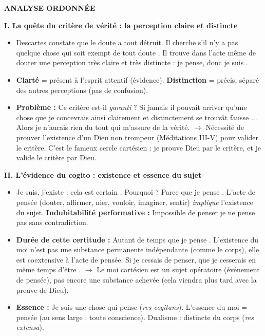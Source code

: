 \documentclass[11pt]{article}
\newcommand{\cle}[1]{{\popxbold\color{popdark}#1}}
\begin{document}
\begin{corrige}
\textbf{ANALYSE ORDONNÉE}

\textbf{I. La quête du critère de vérité : la perception claire et distincte}
\begin{itemize}
\item Descartes constate que le doute a tout détruit. Il cherche \guillemotleft s'il n'y a pas quelque chose qui soit exempt de tout doute \guillemotright. Il trouve dans l'acte même de douter une \cle{perception très claire et très distincte} : \guillemotleft je pense, donc je suis \guillemotright.
\item \textbf{Clarté} = présent à l'esprit attentif (évidence). \textbf{Distinction} = précis, séparé des autres perceptions (pas de confusion).
\item \textbf{Problème :} Ce critère est-il \emph{garanti} ? \guillemotleft Si jamais il pouvait arriver qu'une chose que je concevrais ainsi clairement et distinctement se trouvât fausse \guillemotright... Alors je n'aurais \guillemotleft rien du tout \guillemotright qui m'assure de la vérité. $\rightarrow$ Nécessité de prouver l'existence d'un \cle{Dieu non trompeur} (Méditations III-V) pour valider le critère. C'est le fameux \cle{cercle cartésien} : je prouve Dieu par le critère, et je valide le critère par Dieu.
\end{itemize}

\textbf{II. L'évidence du cogito : existence et essence du sujet}
\begin{itemize}
\item \guillemotleft Je suis, j'existe : cela est certain \guillemotright. Pourquoi ? Parce que \guillemotleft je pense \guillemotright. L'acte de pensée (douter, affirmer, nier, vouloir, imaginer, sentir) \emph{implique} l'existence du sujet. \textbf{Indubitabilité performative :} Impossible de penser \guillemotleft je ne pense pas \guillemotright sans contradiction.
\item \textbf{Durée de cette certitude :} \guillemotleft Autant de temps que je pense \guillemotright. L'existence du moi n'est pas une substance permanente indépendante (comme le corps), elle est \cle{coextensive à l'acte de pensée}. \guillemotleft Si je cessais de penser, que je cesserais en même temps d'être \guillemotright. $\rightarrow$ Le moi cartésien est un \cle{sujet opératoire} (événement de pensée), pas encore une substance achevée (cela viendra plus tard avec la preuve de Dieu).
\item \textbf{Essence :} \guillemotleft Je suis une chose qui pense \guillemotright (\emph{res cogitans}). L'essence du moi = \cle{pensée} (au sens large : toute conscience). Dualisme : distincte du corps (\emph{res extensa}).
\end{itemize}


\end{corrige}
\end{document}

